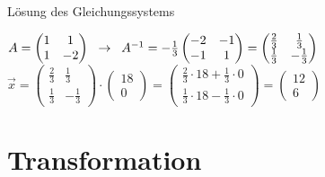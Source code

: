\documentclass[10pt,aspectratio=169]{beamer}
\begin{document}
\begin{frame}{Lösung des Gleichungssystems}
\begin{itemize}
        $A= \begin{pmatrix}
          1 & 1\\
          1 & -2\\
        \end{pmatrix}\hspace{0.2cm} \rightarrow \hspace{0.2cm}
        A^{-1} = -\frac{1}{3}
        \begin{pmatrix}
          -2 & -1\\
          -1 & 1
        \end{pmatrix}
        = \begin{pmatrix}
          \frac{2}{3} & \frac{1}{3}\\
          \frac{1}{3} & -\frac{1}{3}
        \end{pmatrix}
        $\\\vspace{0.25cm}
        $
        \vec{x} = 
        \begin{pmatrix}
          \frac{2}{3} & \frac{1}{3}\\
          \frac{1}{3} & -\frac{1}{3}
        \end{pmatrix}
        \cdot
        \begin{pmatrix}
          18\\
          0
        \end{pmatrix}
        =
        \begin{pmatrix}
          \frac{2}{3}\cdot18 + \frac{1}{3} \cdot 0\\
          \frac{1}{3}\cdot18 - \frac{1}{3} \cdot 0
        \end{pmatrix}
        =
        \begin{pmatrix}
          12\\
          6
        \end{pmatrix}
        $
      
    \end{itemize}
  \end{frame}

  \section{Transformation}
\end{document}
